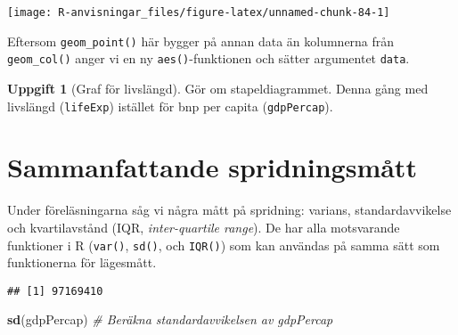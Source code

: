 \documentclass[
]{book}
\newenvironment{Shaded}{\begin{snugshade}}{\end{snugshade}}
\newcommand{\CommentTok}[1]{\textcolor[rgb]{0.56,0.35,0.01}{\textit{#1}}}
\newcommand{\FunctionTok}[1]{\textcolor[rgb]{0.13,0.29,0.53}{\textbf{#1}}}
\newcommand{\NormalTok}[1]{#1}
\newcommand{\OtherTok}[1]{\textcolor[rgb]{0.56,0.35,0.01}{#1}}
\newcommand{\SpecialCharTok}[1]{\textcolor[rgb]{0.81,0.36,0.00}{\textbf{#1}}}
\theoremstyle{definition}
\theoremstyle{definition}
\theoremstyle{definition}
\newtheorem{exercise}{Uppgift}[chapter]
\theoremstyle{definition}
\theoremstyle{remark}
\begin{document}
\begin{center}\texttt{[image: R-anvisningar\_files/figure-latex/unnamed-chunk-84-1]} \end{center}

Eftersom \texttt{geom\_point()} här bygger på annan data än kolumnerna från \texttt{geom\_col()} anger vi en ny \texttt{aes()}-funktionen och sätter argumentet \texttt{data}.

\begin{exercise}[Graf för livslängd]
Gör om stapeldiagrammet. Denna gång med livslängd (\texttt{lifeExp}) istället för bnp per capita (\texttt{gdpPercap}).
\end{exercise}

\hypertarget{sammanfattande-spridningsmuxe5tt}{%
\section{Sammanfattande spridningsmått}\label{sammanfattande-spridningsmuxe5tt}}

Under föreläsningarna såg vi några mått på spridning: varians, standardavvikelse och kvartilavstånd (IQR, \emph{inter-quartile range}). De har alla motsvarande funktioner i R (\texttt{var()}, \texttt{sd()}, och \texttt{IQR()}) som kan användas på samma sätt som funktionerna för lägesmått.

\begin{Shaded}
\end{Shaded}

\begin{verbatim}
## [1] 97169410
\end{verbatim}

\begin{Shaded}
\begin{Highlighting}[]
\FunctionTok{sd}\NormalTok{(gdpPercap)                                    }\CommentTok{\# Beräkna standardavvikelsen av gdpPercap}
\end{Highlighting}
\end{Shaded}
\end{document}
